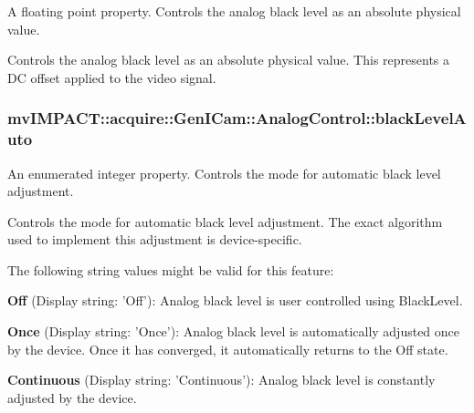 A floating point property. Controls the analog black level as an absolute physical value. 

Controls the analog black level as an absolute physical value. This represents a D\+C offset applied to the video signal. \hypertarget{classmv_i_m_p_a_c_t_1_1acquire_1_1_gen_i_cam_1_1_analog_control_a57b9f08ca4f27baa4ac48653c252a34f}{
\subsubsection[{black\+Level\+Auto}]{ mv\+I\+M\+P\+A\+C\+T\+::acquire\+::\+Gen\+I\+Cam\+::\+Analog\+Control\+::black\+Level\+Auto}}\label{classmv_i_m_p_a_c_t_1_1acquire_1_1_gen_i_cam_1_1_analog_control_a57b9f08ca4f27baa4ac48653c252a34f}


An enumerated integer property. Controls the mode for automatic black level adjustment. 

Controls the mode for automatic black level adjustment. The exact algorithm used to implement this adjustment is device-\/specific.

The following string values might be valid for this feature\+:
\begin{DoxyItemize}
\item {\bfseries Off} (Display string\+: 'Off')\+: Analog black level is user controlled using Black\+Level.
\item {\bfseries Once} (Display string\+: 'Once')\+: Analog black level is automatically adjusted once by the device. Once it has converged, it automatically returns to the Off state.
\item {\bfseries Continuous} (Display string\+: 'Continuous')\+: Analog black level is constantly adjusted by the device.
\end{DoxyItemize}

